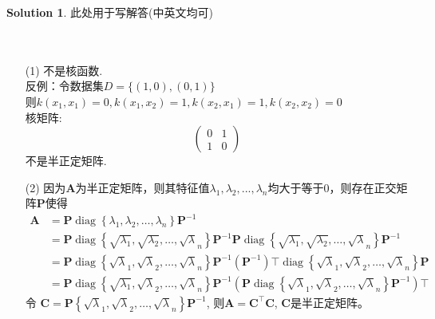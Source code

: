 \documentclass[a4paper,UTF8]{article}
\numberwithin{equation}{section}
\theoremstyle{definition}
\newtheorem*{solution}{Solution}
\def \A {\mathbf{A}}
\def \C {\mathbf{C}}
\begin{document}
\begin{solution}
此处用于写解答(中英文均可)
~\\
~\\
~\\
\begin{enumerate}
	\item[(1)]
	不是核函数. \\
	反例：令数据集$D=\{(1,0), (0,1)\}$ \\
	则$k(x_1, x_1) = 0, k(x_1,x_2) = 1, k(x_2, x_1) = 1, k(x_2, x_2)=0$ \\
	核矩阵:\\
	\begin{equation}
		\left(
		\begin{array}{cc}
			0 & 1 \\
			1 & 0
		\end{array}
		\right)
	\end{equation}
	不是半正定矩阵.
	\item[(2)]
	因为$\A$为半正定矩阵，则其特征值$\lambda_1, \lambda_2,...,\lambda_n$均大于等于0，则存在正交矩阵$\textbf{P}$使得\\
	\begin{equation}
		\begin{aligned} \mathbf{A} & =\mathbf{P} \operatorname{diag}\left\{\lambda_{1}, \lambda_{2}, \ldots, \lambda_{n}\right\} \mathbf{P}^{-1} \\ & =\mathbf{P} \operatorname{diag}\left\{\sqrt{\lambda_{1}}, \sqrt{\lambda_{2}}, \ldots, \sqrt{\lambda}_{n}\right\} \mathbf{P}^{-1} \mathbf{P} \operatorname{diag}\left\{\sqrt{\lambda_{1}}, \sqrt{\lambda_{2}}, \ldots, \sqrt{\lambda}_{n}\right\} \mathbf{P}^{-1} \\ & =\mathbf{P} \operatorname{diag}\left\{\sqrt{\lambda}_{1}, \sqrt{\lambda}_{2}, \ldots, \sqrt{\lambda}_{n}\right\} \mathbf{P}^{-1}\left(\mathbf{P}^{-1}\right) \top \operatorname{diag}\left\{\sqrt{\lambda}_{1}, \sqrt{\lambda}_{2}, \ldots, \sqrt{\lambda}_{n}\right\} \mathbf{P} \\ & =\mathbf{P} \operatorname{diag}\left\{\sqrt{\lambda_{1}}, \sqrt{\lambda}_{2}, \ldots, \sqrt{\lambda}_{n}\right\} \mathbf{P}^{-1}\left(\mathbf{P} \operatorname{diag}\left\{\sqrt{\lambda}_{1}, \sqrt{\lambda}_{2}, \ldots, \sqrt{\lambda}_{n}\right\} \mathbf{P}^{-1}\right) \top\end{aligned}
	\end{equation}
	令 $\mathbf{C}=\mathbf{P}\left\{\sqrt{\lambda}_{1}, \sqrt{\lambda}_{2}, \ldots, \sqrt{\lambda}_{n}\right\} \mathbf{P}^{-1}$, 则$\A=\C^{\top}\C$, $\C$是半正定矩阵。

\end{enumerate}
\end{solution}
\end{document}
